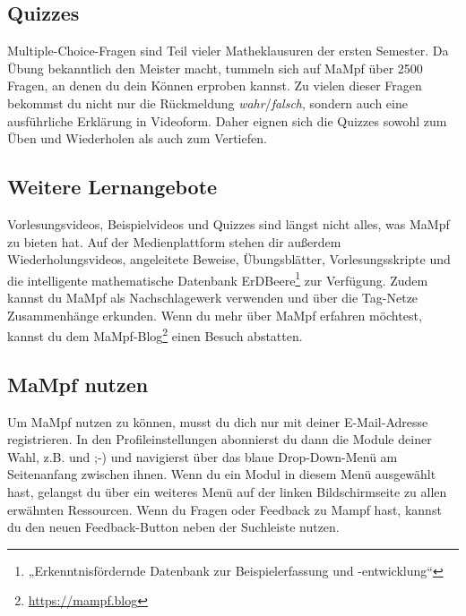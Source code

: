 \subsection{Quizzes}
Multiple-Choice-Fragen sind Teil vieler Matheklausuren der ersten Semester. Da Übung bekanntlich den Meister macht, tummeln sich auf MaMpf über 2500 Fragen, an denen du dein Können erproben kannst. Zu vielen dieser Fragen bekommst du nicht nur die Rückmeldung \emph{wahr}/\emph{falsch}, sondern auch eine ausführliche Erklärung in Videoform. Daher eignen sich die Quizzes sowohl zum Üben und Wiederholen als auch zum Vertiefen.

\subsection{Weitere Lernangebote}
Vorlesungsvideos, Beispielvideos und Quizzes sind längst nicht alles, was MaMpf zu bieten hat.
Auf der Medienplattform stehen dir außerdem Wiederholungsvideos, angeleitete Beweise, Übungsblätter, Vorlesungsskripte und die intelligente mathematische Datenbank ErDBeere\footnote{„Erkenntnisfördernde Datenbank zur Beispielerfassung und -entwicklung“} zur Verfügung. Zudem kannst du MaMpf als Nachschlagewerk verwenden und über die Tag-Netze Zusammenhänge erkunden. Wenn du mehr über MaMpf erfahren möchtest, kannst du dem MaMpf-Blog\footnote{\url{https://mampf.blog}} einen Besuch abstatten.  

\subsection{MaMpf nutzen}
Um MaMpf nutzen zu können, musst du dich nur mit deiner E-Mail-Adresse registrieren. In den Profileinstellungen abonnierst du dann die Module deiner Wahl, z.B.  und  ;-) und navigierst über das blaue Drop-Down-Menü am Seitenanfang zwischen ihnen. Wenn du ein Modul in diesem Menü ausgewählt hast, gelangst du über ein weiteres Menü auf der linken Bildschirmseite zu allen erwähnten Ressourcen. Wenn du Fragen oder Feedback zu Mampf hast, kannst du den neuen Feedback-Button neben der Suchleiste nutzen.
